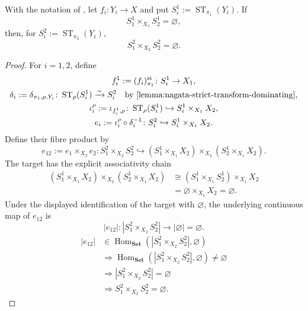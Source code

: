 \begin{lemma}
  \label{lemma:nagata-strict-transform-disjoint-dominating}
  \lean{}

  With the notation of
  , let
  $f_i\colon Y_i\to X$ and put
  $S_i^1:=\operatorname{ST}_{\pi_1}(Y_i)$.  If
  \[
    S_1^1\times_{X_1}S_2^1=\varnothing,
  \]
  then, for $S_i^2:=\operatorname{ST}_{\pi_2}(Y_i)$,
  \[
    S_1^2\times_{X_2}S_2^2=\varnothing.
  \]
\end{lemma}

\begin{proof}
  For $i=1,2$, define
  \[
  \begin{gathered}
    f_i^1:=(f_i)_{\pi_1}^{\mathrm{st}}\colon S_i^1\to X_1,\\
    \delta_i:=\delta_{\pi_1,\rho,Y_i}\colon
      \operatorname{ST}_{\rho}(S_i^1)\xrightarrow{\sim}S_i^2
      \quad\text{by \Cref{lemma:nagata-strict-transform-dominating}},\\
    \iota_i^\rho:=\iota_{f_i^1,\rho}\colon
      \operatorname{ST}_{\rho}(S_i^1)
        \hookrightarrow S_i^1\times_{X_1}X_2,\\
    e_i:=\iota_i^\rho\circ\delta_i^{-1}\colon
      S_i^2\hookrightarrow S_i^1\times_{X_1}X_2.
  \end{gathered}
  \]
  Define their fibre product by
  \[
    e_{12}:=e_1\times_{X_2}e_2\colon
      S_1^2\times_{X_2}S_2^2
      \hookrightarrow
      (S_1^1\times_{X_1}X_2)
        \times_{X_2}(S_2^1\times_{X_1}X_2).
  \]
  The target has the explicit associativity chain
  \[
  \begin{aligned}
    (S_1^1\times_{X_1}X_2)
      \times_{X_2}(S_2^1\times_{X_1}X_2)
      &\cong(S_1^1\times_{X_1}S_2^1)\times_{X_1}X_2\\
      &=\varnothing\times_{X_1}X_2=\varnothing.
  \end{aligned}
  \]
  Under the displayed identification of the target with $\varnothing$, the
  underlying continuous map of $e_{12}$ is
  \[
    |e_{12}|\colon
      |S_1^2\times_{X_2}S_2^2|
        \longrightarrow|\varnothing|=\varnothing.
  \]
  \[
  \begin{aligned}
    |e_{12}|&\in
      \operatorname{Hom}_{\mathbf{Set}}
        (|S_1^2\times_{X_2}S_2^2|,\varnothing)\\
    &\Longrightarrow
      \operatorname{Hom}_{\mathbf{Set}}
        (|S_1^2\times_{X_2}S_2^2|,\varnothing)\neq\varnothing\\
    &\Longrightarrow
      |S_1^2\times_{X_2}S_2^2|=\varnothing\\
    &\Longrightarrow
      S_1^2\times_{X_2}S_2^2=\varnothing.
  \end{aligned}
  \]
\end{proof}

